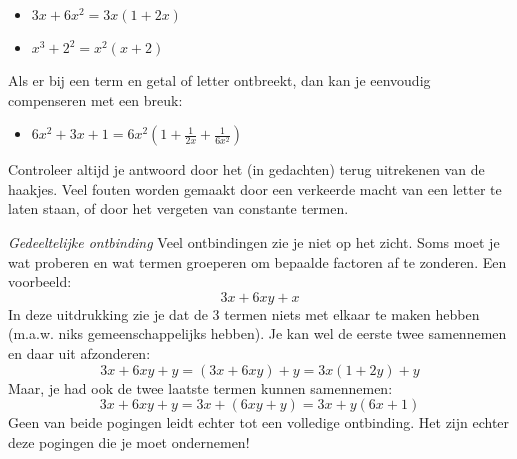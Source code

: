 \begin{voorbeeld}
	\begin{itemize}
		\item $3x+6x^2=3x(1+2x)$
		\item $x^3+2^2=x^2(x+2)$
	\end{itemize}
\end{voorbeeld}

Als er bij een term en getal of letter ontbreekt, dan kan je eenvoudig compenseren met een breuk:

\begin{voorbeeld}
	\begin{itemize}
		\item $6x^2+3x+1=6x^2(1+\frac{1}{2x}+\frac{1}{6x^2})$
	\end{itemize}
\end{voorbeeld}

Controleer altijd je antwoord door het (in gedachten) terug uitrekenen van de haakjes. Veel fouten worden gemaakt door een verkeerde macht van een letter te laten staan, of door het vergeten van constante termen.

\emph{Gedeeltelijke ontbinding}
Veel ontbindingen zie je niet op het zicht. Soms moet je wat proberen en wat termen groeperen om bepaalde factoren af te zonderen. Een voorbeeld:
\begin{equation*}
3x+6xy+x
\end{equation*}
In deze uitdrukking zie je dat de 3 termen niets met elkaar te maken hebben (m.a.w. niks gemeenschappelijks hebben). Je kan wel de eerste twee samennemen en daar  uit afzonderen:
\begin{equation*}
3x+6xy+y = (3x+6xy)+y = 3x(1+2y)+y
\end{equation*}
Maar, je had ook de twee laatste termen kunnen samennemen:
\begin{equation*}
3x+6xy+y = 3x+(6xy+y) = 3x+y(6x+1)
\end{equation*}
Geen van beide pogingen leidt echter tot een volledige ontbinding. Het zijn echter deze pogingen die je moet ondernemen!


